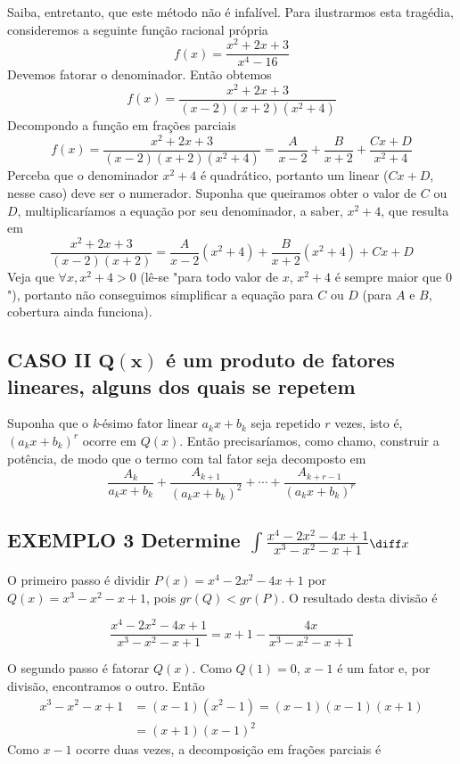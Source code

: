 \documentclass[a4paper, 12pt]{extreport}
\begin{document}
          Saiba, entretanto, que este método não é infalível. Para ilustrarmos esta tragédia, consideremos a seguinte função racional própria
          $$ f(x) = \frac{x^2+2x+3}{x^4-16} $$
          Devemos fatorar o denominador. Então obtemos
          $$ f(x) = \frac{x^2+2x+3}{(x-2)(x+2)(x^2+4)} $$
          \vspace{1mm}
          Decompondo a função em frações parciais
          $$ f(x) = \frac{x^2+2x+3}{(x-2)(x+2)(x^2+4)} = \frac{A}{x-2} + \frac{B}{x+2} + \frac{Cx+D}{x^2+4} $$
          \vspace{1mm}
          Perceba que o denominador $x^2+4$ é quadrático, portanto um linear ($Cx+D$, nesse caso) deve ser o numerador.
          Suponha que queiramos obter o valor de $C$ ou $D$, multiplicaríamos a equação por seu denominador, a saber, $x^2+4$, que resulta em
          $$ \frac{x^2+2x+3}{(x-2)(x+2)} = \frac{A}{x-2}(x^2+4) + \frac{B}{x+2}(x^2+4) + Cx+D $$
          \vspace{1mm}
          Veja que $\forall x, x^2+4 > 0$ (lê-se "para todo valor de $x$, $x^2+4$ é sempre maior que $0$"), portanto não conseguimos simplificar a
          equação para $C$ ou $D$ (para $A$ e $B$, cobertura ainda funciona).

    \vspace{10mm}
    \subsection*{\small CASO II $\mathbf{Q(x)}$ é um produto de fatores lineares, alguns dos quais se repetem}
      Suponha que o \textsl{k}-ésimo fator linear $a_kx+b_k$ seja repetido $r$ vezes, isto é, $(a_kx+b_k)^r$ ocorre em $Q(x)$. Então precisaríamos, como chamo,
      construir a potência, de modo que o termo com tal fator seja decomposto em
      $$ \frac{A_k}{a_kx+b_k} + \frac{A_{k+1}}{(a_kx+b_k)^2} + \cdots + \frac{A_{k+r-1}}{(a_kx+b_k)^r} $$

      \subsection*{\small {\color{astral}EXEMPLO 3} \textmd{Determine \large$\int{\frac{x^4-2x^2-4x+1}{x^3-x^2-x+1}}$\normalsize$\diff x$}}
        O primeiro passo é dividir $P(x) = x^4-2x^2-4x+1$ por $Q(x)= x^3-x^2-x+1$, pois $gr(Q) < gr(P)$. O resultado desta divisão é

        $$ \frac{x^4-2x^2-4x+1}{x^3-x^2-x+1} = x+1-\frac{4x}{x^3-x^2-x+1} $$

        \vspace{3mm}
        \noindent O segundo passo é fatorar $Q(x)$. Como $Q(1) = 0$, $x-1$ é um fator e, por divisão, encontramos o outro. Então
        \begin{equation*}
          \begin{split}
            x^3-x^2-x+1 & = (x-1)(x^2-1) = (x-1)(x-1)(x+1) \\
                        & = (x+1)(x-1)^2
          \end{split}
        \end{equation*}
        Como $x-1$ ocorre duas vezes, a decomposição em frações parciais é
\end{document}
